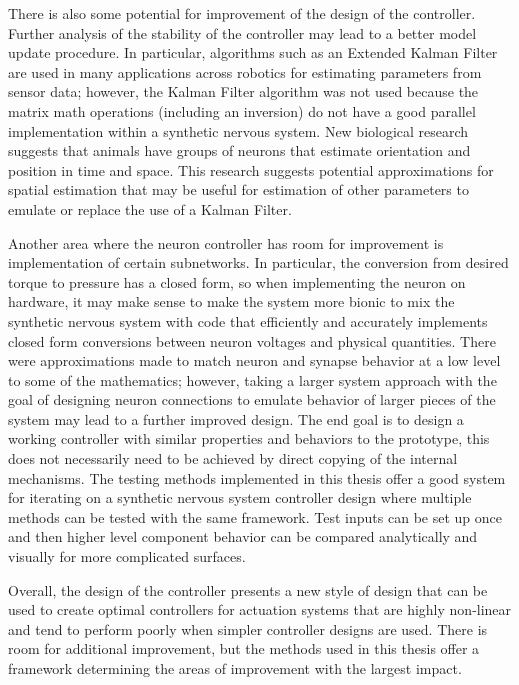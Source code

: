 There is also some potential for improvement of the design of the controller.
Further analysis of the stability of the controller may lead to a better model
update procedure. In particular, algorithms such as an Extended Kalman Filter
are used in many applications across robotics for estimating parameters from
sensor data; however, the Kalman Filter algorithm was not used because the matrix math operations (including an inversion) do
not have a good parallel implementation within a synthetic nervous system.
New biological research %
suggests that animals have groups of neurons that estimate orientation and
position in time and space. This research suggests potential approximations for
spatial estimation that may be useful for estimation of other parameters to
emulate or replace the use of a Kalman Filter.

Another area where the neuron controller has room for improvement is
implementation of certain subnetworks. In particular, the conversion from desired torque to pressure has a closed form, so
when implementing the neuron on hardware, it may make sense to make the system more bionic to mix the synthetic nervous system
with code that efficiently and accurately implements closed form conversions between neuron voltages and physical quantities.
There were approximations made to match neuron
and synapse behavior at a low level to some of the mathematics; however, taking
a larger system approach with the goal of designing neuron connections to emulate
behavior of larger pieces of the system may lead to a further improved design.
The end goal is to design a working controller with similar properties and behaviors to the prototype, this
does not necessarily need to be achieved by direct copying of the internal mechanisms. The testing methods implemented
in this thesis offer a good system for iterating on a synthetic nervous system controller design where multiple methods
can be tested with the same framework. Test
inputs can be set up once and then higher level component behavior can be
compared analytically and visually for more complicated surfaces.

Overall, the design of the controller presents a new style of design that can be
used to create optimal controllers for actuation systems that are highly
non-linear and tend to perform poorly when simpler controller designs are used.
There is room for additional improvement, but the methods used in this thesis offer a
framework determining the areas of improvement with the largest impact.
